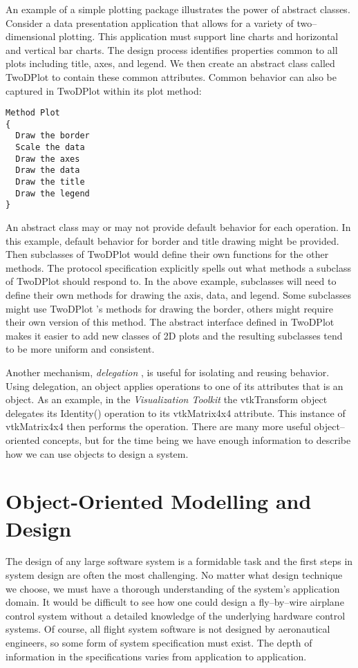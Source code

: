 An example of a simple plotting package illustrates the power of abstract classes. Consider a data presentation application that allows for a variety of two--dimensional plotting. This application must support line charts and horizontal and vertical bar charts. The design process identifies properties common to all plots including title, axes, and legend. We then create an abstract class called TwoDPlot to contain these common attributes. Common behavior can also be captured in TwoDPlot within its plot method:

\begin{lstlisting}[caption={TwoDPlot.}]
Method Plot
{
  Draw the border
  Scale the data
  Draw the axes
  Draw the data
  Draw the title
  Draw the legend
}
\end{lstlisting}

An abstract class may or may not provide default behavior for each operation. In this example, default behavior for border and title drawing might be provided. Then subclasses of TwoDPlot would define their own functions for the other methods. The protocol specification explicitly spells out what methods a subclass of TwoDPlot should respond to. In the above example, subclasses will need to define their own methods for drawing the axis, data, and legend. Some subclasses might use TwoDPlot 's methods for drawing the border, others might require their own version of this method. The abstract interface defined in TwoDPlot makes it easier to add new classes of 2D plots and the resulting subclasses tend to be more uniform and consistent.

Another mechanism, \emph{delegation} , is useful for isolating and reusing
behavior. Using delegation, an object applies operations to one of its attributes that is an object. As an example, in the \emph{Visualization Toolkit} the vtkTransform object delegates its Identity() operation to its vtkMatrix4x4 attribute. This instance of vtkMatrix4x4 then performs the operation. There are many more useful object--oriented concepts, but for the time being we have enough information to describe how we can use objects to design a system.

\section{Object-Oriented Modelling and Design}

The design of any large software system is a formidable task and the first steps in system design are often the most challenging. No matter what design technique we choose, we must have a thorough understanding of the system's application domain. It would be difficult to see how one could design a fly--by--wire airplane control system without a detailed knowledge of the underlying hardware control systems. Of course, all flight system software is not designed by aeronautical engineers, so some form of system specification must exist. The depth of information in the specifications varies from application to application.

